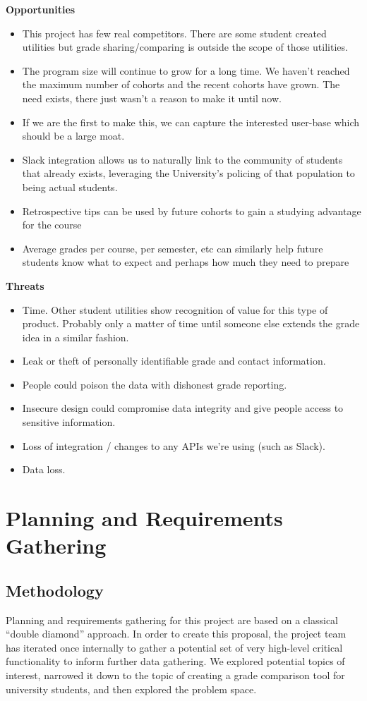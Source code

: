 \textbf{Opportunities}
\begin{itemize}
    \item This project has few real competitors. There are some student created utilities but grade sharing/comparing is outside the scope of those utilities.
    \item The program size will continue to grow for a long time. We haven't reached the maximum number of cohorts and the recent cohorts have grown. The need exists, there just wasn't a reason to make it until now.
    \item If we are the first to make this, we can capture the interested user-base which should be a large moat.
    \item Slack integration allows us to naturally link to the community of students that already exists, leveraging the University's policing of that population to being actual students.
    \item Retrospective tips can be used by future cohorts to gain a studying advantage for the course
    \item Average grades per course, per semester, etc can similarly help future students know what to expect and perhaps how much they need to prepare
\end{itemize}
\textbf{Threats}
\begin{itemize}
    \item Time. Other student utilities show recognition of value for this type of product. Probably only a matter of time until someone else extends the grade idea in a similar fashion.
    \item Leak or theft of personally identifiable grade and contact information.
    \item People could poison the data with dishonest grade reporting.
    \item Insecure design could compromise data integrity and give people access to sensitive information.
    \item Loss of integration / changes to any APIs we're using (such as Slack).
    \item Data loss.
\end{itemize}
\section{Planning and Requirements Gathering}
\subsection{Methodology}
Planning and requirements gathering for this project are based on a classical ``double diamond'' approach. In order to create this proposal, the project team has iterated once internally to gather a potential set of very high-level critical functionality to inform further data gathering. We explored potential topics of interest, narrowed it down to the topic of creating a grade comparison tool for university students, and then explored the problem space.

